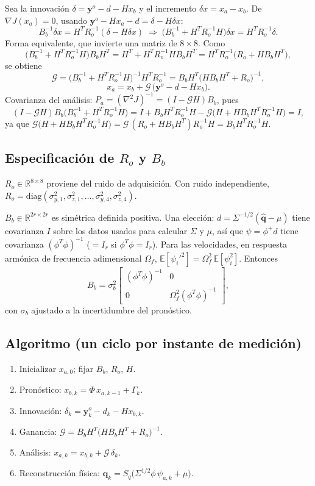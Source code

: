 Sea la innovación $\delta=\mathbf y^o-d-Hx_b$ y el incremento $\delta x=x_a-x_b$. De $\nabla J(x_a)=0$, usando $\mathbf y^o-Hx_a-d=\delta-H\delta x$:
\[
B_b^{-1}\delta x=H^TR_o^{-1}(\delta-H\delta x)
\;\Longrightarrow\;
\big(B_b^{-1}+H^TR_o^{-1}H\big)\delta x=H^TR_o^{-1}\delta .
\]
Forma equivalente, que invierte una matriz de $8\times8$. Como
\[
\big(B_b^{-1}+H^TR_o^{-1}H\big)B_bH^T=H^T+H^TR_o^{-1}HB_bH^T=H^TR_o^{-1}\big(R_o+HB_bH^T\big),
\]
se obtiene
\[
\mathcal G=\big(B_b^{-1}+H^TR_o^{-1}H\big)^{-1}H^TR_o^{-1}=B_bH^T\big(HB_bH^T+R_o\big)^{-1},
\]
\[
x_a=x_b+\mathcal G\,\big(\mathbf y^o-d-Hx_b\big).
\]
Covarianza del análisis: $P_a=(\nabla^2J)^{-1}=(I-\mathcal GH)B_b$, pues
\[
(I-\mathcal GH)B_b\big(B_b^{-1}+H^TR_o^{-1}H\big)=I+B_bH^TR_o^{-1}H-\mathcal G\big(H+HB_bH^TR_o^{-1}H\big)=I,
\]
ya que $\mathcal G\big(H+HB_bH^TR_o^{-1}H\big)=\mathcal G\,(R_o+HB_bH^T)R_o^{-1}H=B_bH^TR_o^{-1}H$.

\subsection{Especificación de $R_o$ y $B_b$}

$R_o\in\mathbb R^{8\times8}$ proviene del ruido de adquisición. Con ruido independiente,
$R_o=\mathrm{diag}(\sigma_{y,1}^2,\sigma_{z,1}^2,\dots,\sigma_{y,4}^2,\sigma_{z,4}^2)$.

$B_b\in\mathbb R^{2r\times2r}$ es simétrica definida positiva. Una elección: $d=\Sigma^{-1/2}(\hat{\mathbf q}-\mu)$ 
tiene covarianza $I$ sobre los datos usados para calcular $\Sigma$ y $\mu$, así que $\psi=\phi^{+}d$ tiene covarianza 
$(\phi^T\phi)^{-1}$ ($=I_r$ si $\phi^T\phi=I_r$). Para las velocidades, en respuesta armónica de frecuencia adimensional 
$\Omega_f$, $\mathbb E[\psi_i'^2]=\Omega_f^2\,\mathbb E[\psi_i^2]$. Entonces
\[
B_b=\sigma_b^2\begin{bmatrix}(\phi^T\phi)^{-1}&0\\0&\Omega_f^2(\phi^T\phi)^{-1}\end{bmatrix},
\]
con $\sigma_b$ ajustado a la incertidumbre del pronóstico.

\subsection{Algoritmo (un ciclo por instante de medición)}

\begin{enumerate}
\item Inicializar $x_{a,0}$; fijar $B_b$, $R_o$, $H$.
\item Pronóstico: $x_{b,k}=\Phi\,x_{a,k-1}+\Gamma_k$.
\item Innovación: $\delta_k=\mathbf y^o_k-d_k-Hx_{b,k}$.
\item Ganancia: $\mathcal G=B_bH^T\big(HB_bH^T+R_o\big)^{-1}$.
\item Análisis: $x_{a,k}=x_{b,k}+\mathcal G\,\delta_k$.
\item Reconstrucción física: $\mathbf q_k=S_q\big(\Sigma^{1/2}\phi\,\psi_{a,k}+\mu\big)$.
\end{enumerate}


